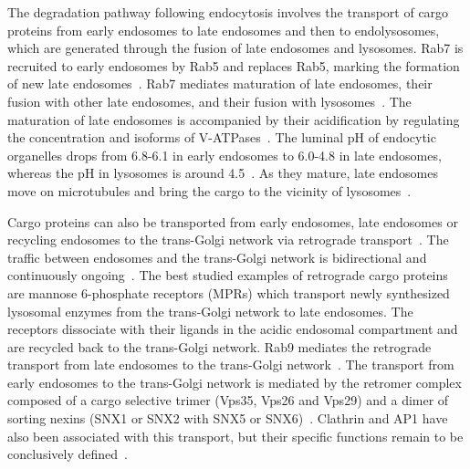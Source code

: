 The degradation pathway following endocytosis involves the transport of cargo proteins from early endosomes to late endosomes and then to endolysosomes, which are generated through the fusion of late endosomes and lysosomes. Rab7 is recruited to early endosomes by Rab5 and replaces Rab5, marking the formation of new late endosomes~\cite{Huotari}. Rab7 mediates maturation of late endosomes, their fusion with other late endosomes, and their fusion with lysosomes~\cite{Stenmark}. The maturation of late endosomes is accompanied by their acidification by regulating the concentration and isoforms of V-ATPases~\cite{Huotari}. The luminal pH of endocytic organelles drops from 6.8-6.1 in early endosomes to 6.0-4.8 in late endosomes, whereas the pH in lysosomes is around 4.5~\cite{Maxfield}. As they mature, late endosomes move on microtubules and bring the cargo to the vicinity of lysosomes~\cite{Huotari}.

Cargo proteins can also be transported from early endosomes, late endosomes or recycling endosomes to the trans-Golgi network via retrograde transport~\cite{Huotari,Johannes}. The traffic between endosomes and the trans-Golgi network is bidirectional and continuously ongoing~\cite{Huotari}. The best studied examples of retrograde cargo proteins are mannose 6-phosphate receptors (MPRs) which transport newly synthesized lysosomal enzymes from the trans-Golgi network to late endosomes. The receptors dissociate with their ligands in the acidic endosomal compartment and are recycled back to the trans-Golgi network. Rab9 mediates the retrograde transport from late endosomes to the trans-Golgi network~\cite{Stenmark}. The transport from early endosomes to the trans-Golgi network is mediated by the retromer complex composed of a cargo selective trimer (Vps35, Vps26 and Vps29) and a dimer of sorting nexins (SNX1 or SNX2 with SNX5 or SNX6)~\cite{Johannes,Seaman}. Clathrin and AP1 have also been associated with this transport, but their specific functions remain to be conclusively defined~\cite{Seaman}.
\newcommand{\keyword}[1]{\textbf{#1}}
\newcommand{\tabhead}[1]{\textbf{#1}}
\newcommand{\code}[1]{\texttt{#1}}
\newcommand{\file}[1]{\texttt{\bfseries#1}}
\newcommand{\option}[1]{\texttt{\itshape#1}}
